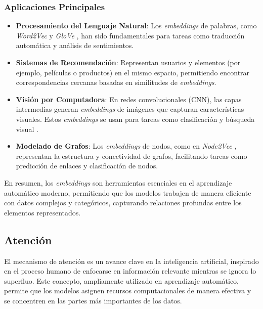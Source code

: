 \subsubsection*{Aplicaciones Principales}

\begin{itemize}
    \item \textbf{Procesamiento del Lenguaje Natural}:
    Los \textit{embeddings} de palabras, como \textit{Word2Vec} \cite{mikolov2013efficient} y \textit{GloVe} \cite{pennington2014glove}, han sido fundamentales para tareas como traducción automática y análisis de sentimientos.

    \item \textbf{Sistemas de Recomendación}:
    Representan usuarios y elementos (por ejemplo, películas o productos) en el mismo espacio, permitiendo encontrar correspondencias cercanas basadas en similitudes de \textit{embeddings}.

    \item \textbf{Visión por Computadora}:
    En redes convolucionales (CNN), las capas intermedias generan \textit{embeddings} de imágenes que capturan características visuales. Estos \textit{embeddings} se usan para tareas como clasificación y búsqueda visual \cite{krizhevsky2012imagenet}.

    \item \textbf{Modelado de Grafos}:
    Los \textit{embeddings} de nodos, como en \textit{Node2Vec} \cite{grover2016node2vec}, representan la estructura y conectividad de grafos, facilitando tareas como predicción de enlaces y clasificación de nodos.
\end{itemize}

En resumen, los \textit{embeddings} son herramientas esenciales en el aprendizaje automático moderno, permitiendo que los modelos trabajen de manera eficiente con datos complejos y categóricos, capturando relaciones profundas entre los elementos representados.

\subsection{Atención}

El mecanismo de atención es un avance clave en la inteligencia artificial, inspirado en el proceso humano de enfocarse en información relevante mientras se ignora lo superfluo. Este concepto, ampliamente utilizado en aprendizaje automático, permite que los modelos asignen recursos computacionales de manera efectiva y se concentren en las partes más importantes de los datos.

